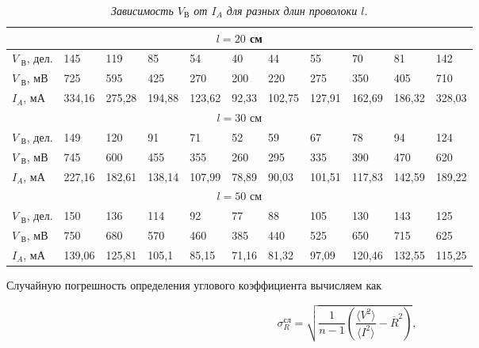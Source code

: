 \documentclass[a4paper,12pt]{article} %
\begin{document}
\begin{table}[h]
	\noindent\begin{tabular}{|p{}|p{1cm}|p{1cm}|p{1cm}|p{1cm}|p{1cm}|p{1cm}|p{1cm}|p{1cm}|p{1cm}|p{1cm}|}
		\hline
		\multicolumn{11}{|c|}{$ l = 20 $ см}                                                                    \\ \hline
		$ V_\text{ В} $, дел. & 145    & 119    & 85     & 54     & 40    & 44     & 55     & 70     & 81     & 142    \\ \hline
		$ V_\text{ В} $, мВ      & 725    & 595    & 425    & 270    & 200   & 220    & 275    & 350    & 405    & 710    \\ \hline
		$ I_A $, мА      & 334,16 & 275,28 & 194,88 & 123,62 & 92,33 & 102,75 & 127,91 & 162,69 & 186,32 & 328,03 \\ \hline
		\multicolumn{11}{|c|}{$ l = 30 $ см}                                                                    \\ \hline
		$ V_\text{ В} $, дел. & 149    & 120    & 91     & 71     & 52    & 59     & 67     & 78     & 94     & 124    \\ \hline
		$ V_\text{ В} $, мВ      & 745    & 600    & 455    & 355    & 260   & 295    & 335    & 390    & 470    & 620    \\ \hline
		$ I_A $, мА      & 227,16 & 182,61 & 138,14 & 107,99 & 78,89 & 90,03  & 101,51 & 117,83 & 142,59 & 189,22 \\ \hline
		\multicolumn{11}{|c|}{$ l = 50 $ см}                                                                    \\ \hline
		$ V_\text{ В} $, дел. & 150    & 136    & 114    & 92     & 77    & 88     & 105    & 130    & 143    & 125    \\ \hline
		$ V_\text{ В} $, мВ      & 750    & 680    & 570    & 460    & 385   & 440    & 525    & 650    & 715    & 625    \\ \hline
		$ I_A $, мА      & 139,06 & 125,81 & 105,1  & 85,15  & 71,16 & 81,32  & 97,09  & 120,46 & 132,55 & 115,25 \\ \hline
	\end{tabular}
\caption{\textit{Зависимость $ V_\text{В} $ от $ I_A $ для разных длин проволоки $ l $.}}\label{tab:VotI}

\end{table}

Случайную погрешность определения углового коэффициента вычисляем как

\begin{equation}
\sigma^\text{сл}_R = \sqrt{\frac{1}{n-1}\left( \frac{\langle V^2\rangle}{\langle I^2 \rangle} - \overline{R}^2 \right) },
\end{equation}
\end{document}
